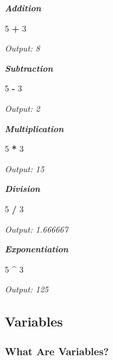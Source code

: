 \documentclass[
]{book}
\newenvironment{Shaded}{\begin{snugshade}}{\end{snugshade}}
\newcommand{\DecValTok}[1]{\textcolor[rgb]{0.00,0.00,0.81}{#1}}
\newcommand{\SpecialCharTok}[1]{\textcolor[rgb]{0.81,0.36,0.00}{\textbf{#1}}}
\begin{document}
\textbf{\emph{Addition}}

\begin{Shaded}
\begin{Highlighting}[]
\DecValTok{5} \SpecialCharTok{+} \DecValTok{3}
\end{Highlighting}
\end{Shaded}

\emph{Output: 8}

\textbf{\emph{Subtraction}}

\begin{Shaded}
\begin{Highlighting}[]
\DecValTok{5} \SpecialCharTok{{-}} \DecValTok{3}
\end{Highlighting}
\end{Shaded}

\emph{Output: 2}

\textbf{\emph{Multiplication}}

\begin{Shaded}
\begin{Highlighting}[]
\DecValTok{5} \SpecialCharTok{*} \DecValTok{3}
\end{Highlighting}
\end{Shaded}

\emph{Output: 15}

\textbf{\emph{Division}}

\begin{Shaded}
\begin{Highlighting}[]
\DecValTok{5} \SpecialCharTok{/} \DecValTok{3}
\end{Highlighting}
\end{Shaded}

\emph{Output: 1.666667}

\textbf{\emph{Exponentiation}}

\begin{Shaded}
\begin{Highlighting}[]
\DecValTok{5} \SpecialCharTok{\^{}} \DecValTok{3}
\end{Highlighting}
\end{Shaded}

\emph{Output: 125}

\subsection*{Variables}\label{variables}

\subsubsection*{What Are Variables?}\label{what-are-variables}
\end{document}
